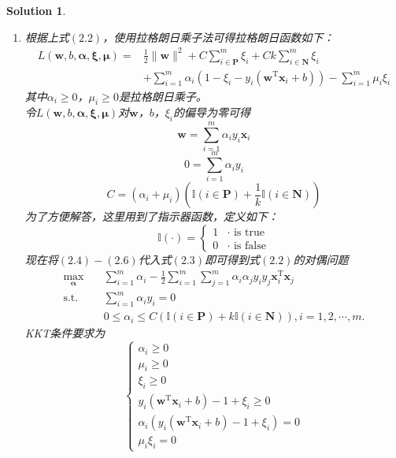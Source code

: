 \documentclass[a4paper,UTF8]{article}
\numberwithin{equation}{section}
\newtheorem*{mySol}{Solution}
\begin{document}
\begin{mySol}
\begin{enumerate}[(1)]
\item 
根据上式$(2.2)$，使用拉格朗日乘子法可得拉格朗日函数如下：
\begin{equation}
\begin{aligned}
L(\mathbf{w},b,\boldsymbol{\alpha},\boldsymbol{\xi},\boldsymbol{\mu}) =& \frac{1}{2} \lVert \mathbf{w} \rVert^2 + C\sum_{i \in \mathbf{P}}^m\xi_i + Ck\sum_{i \in \mathbf{N}}^m\xi_i\\
& + \sum_{i=1}^{m}\alpha_i(1-\xi_i-y_i(\mathbf{w}^\mathrm{T}\mathbf{x}_i + b)) - \sum_{i=1}^{m}\mu_i\xi_i 
\end{aligned}
\end{equation}
其中$\alpha_i \geq 0$，$\mu_i \geq 0$是拉格朗日乘子。\\
令$L(\mathbf{w},b,\boldsymbol{\alpha},\boldsymbol{\xi},\boldsymbol{\mu})$对$\mathbf{w}$，$b$，$\xi_i$的偏导为零可得
\begin{equation}
	\mathbf{w} = \sum_{i=1}^{m}\alpha_iy_i\mathbf{x}_i
\end{equation}
\begin{equation}
	0=\sum_{i=1}^{m}\alpha_iy_i
\end{equation}
\begin{equation}
	C = (\alpha_i + \mu_i)(\mathbb{I}(i\in \mathbf{P}) + \frac{1}{k}\mathbb{I}(i\in \mathbf{N}) )
\end{equation}
为了方便解答，这里用到了指示器函数，定义如下：
\begin{equation}
\mathbb{I}(\cdot) = 
\begin{cases}
1 & \mbox{$\cdot$ is true}\\
0 & \mbox{$\cdot$ is false}
\end{cases}
\end{equation}
现在将$(2.4)-(2.6)$代入式$(2.3)$即可得到式$(2.2)$的对偶问题
\begin{equation}
\begin{split}
\max_{\mathbf{\alpha}}& \quad \sum_{i=1}^{m}\alpha_i-\frac{1}{2}\sum_{i=1}^{m}\sum_{j=1}^{m}\alpha_i\alpha_jy_iy_j\mathbf{x}_i^\mathrm{T}\mathbf{x}_j\\
\text{s.t.}&  \quad \sum_{i=1}^{m}\alpha_iy_i = 0\\
& \quad 0 \leq \alpha_i \leq C(\mathbb{I}(i\in \mathbf{P}) + k\mathbb{I}(i\in \mathbf{N}) ), i = 1,2,\cdots,m.
\end{split}	
\end{equation}
KKT条件要求为
\begin{equation}
\begin{cases}
\alpha_i \geq 0\\
\mu_i \geq 0\\
\xi_i \geq 0\\
y_i(\mathbf{w}^\mathrm{T}\mathbf{x}_i + b) - 1 + \xi_i \geq 0\\
\alpha_i(y_i(\mathbf{w}^\mathrm{T}\mathbf{x}_i + b) - 1 + \xi_i) = 0\\
\mu_i\xi_i = 0
\end{cases}
\end{equation}
\end{enumerate}
\end{mySol}
\newpage
\end{document}
